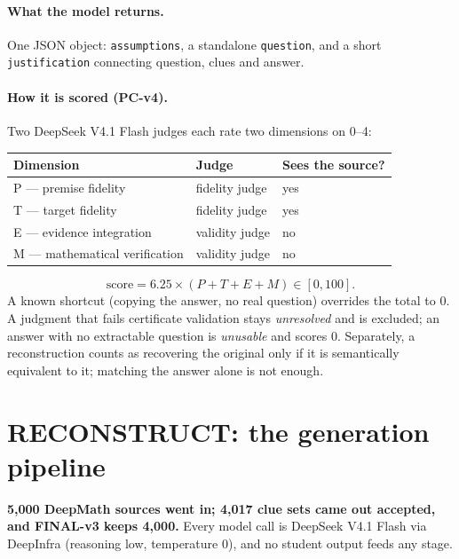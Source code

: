 \documentclass[11pt,a4paper]{article}
\newcommand{\code}[1]{\texttt{#1}}
\begin{document}
\paragraph{What the model returns.} One JSON object: \code{assumptions}, a standalone \code{question}, and a short \code{justification} connecting question, clues and answer.

\paragraph{How it is scored (PC-v4).} Two DeepSeek V4.1 Flash judges each rate two dimensions on 0--4:

\begin{table}[H]
\centering\small
\begin{tabular}{@{}lll@{}}
\toprule
Dimension & Judge & Sees the source? \\
\midrule
P --- premise fidelity & fidelity judge & yes \\
T --- target fidelity & fidelity judge & yes \\
E --- evidence integration & validity judge & no \\
M --- mathematical verification & validity judge & no \\
\bottomrule
\end{tabular}
\end{table}

\[ \text{score} = 6.25 \times (P + T + E + M) \in [0, 100]. \]
A known shortcut (copying the answer, no real question) overrides the total to 0. A judgment that fails certificate validation stays \emph{unresolved} and is excluded; an answer with no extractable question is \emph{unusable} and scores 0. Separately, a reconstruction counts as recovering the original only if it is semantically equivalent to it; matching the answer alone is not enough.

\section{RECONSTRUCT: the generation pipeline}

\textbf{5,000 DeepMath sources went in; 4,017 clue sets came out accepted, and FINAL-v3 keeps 4,000.} Every model call is DeepSeek V4.1 Flash via DeepInfra (reasoning low, temperature 0), and no student output feeds any stage.
\end{document}
